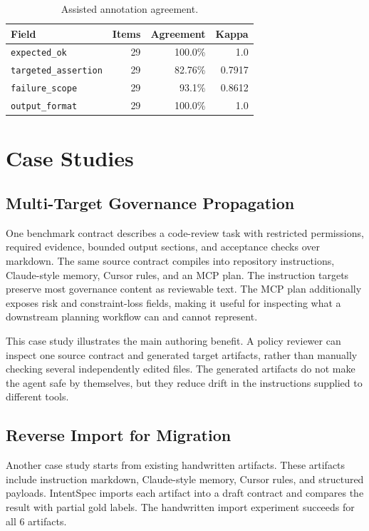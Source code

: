 \documentclass[11pt]{article}
\begin{document}
\begin{table}[htbp]
\caption{Assisted annotation agreement.}
\label{tab:agreement}
\centering
\begin{tabular}{lrrr}
\toprule
Field & Items & Agreement & Kappa \\
\midrule
\texttt{expected\_ok} & 29 & 100.0\% & 1.0 \\
\texttt{targeted\_assertion} & 29 & 82.76\% & 0.7917 \\
\texttt{failure\_scope} & 29 & 93.1\% & 0.8612 \\
\texttt{output\_format} & 29 & 100.0\% & 1.0 \\
\bottomrule
\end{tabular}
\end{table}

\section{Case Studies}

\subsection{Multi-Target Governance Propagation}

One benchmark contract describes a code-review task with restricted permissions,
required evidence, bounded output sections, and acceptance checks over markdown. The
same source contract compiles into repository instructions, Claude-style memory,
Cursor rules, and an MCP plan. The instruction targets preserve most governance
content as reviewable text. The MCP plan additionally exposes risk and
constraint-loss fields, making it useful for inspecting what a downstream planning
workflow can and cannot represent.

This case study illustrates the main authoring benefit. A policy reviewer can
inspect one source contract and generated target artifacts, rather than manually
checking several independently edited files. The generated artifacts do not make the
agent safe by themselves, but they reduce drift in the instructions supplied to
different tools.

\subsection{Reverse Import for Migration}

Another case study starts from existing handwritten artifacts. These artifacts
include instruction markdown, Claude-style memory, Cursor rules, and structured
payloads. IntentSpec imports each artifact into a draft contract and compares the
result with partial gold labels. The handwritten import experiment succeeds for all
6 artifacts.
\end{document}
